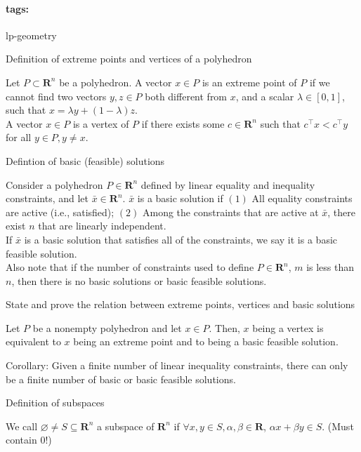 \documentclass[11pt]{article}
\newcommand{\reals}{\mathbf{R}}
\newcommand*{\tags}[1]{\paragraph{tags: }#1\bigskip}
\newcommand*{\xfield}[1]{\begin{mdframed}\centering #1\end{mdframed}\bigskip}
\newenvironment{field}{}{}
\newenvironment{note}{}{}
\begin{document}
\tags{lp-geometry}
\begin{note}
  \xfield{Definition of extreme points and vertices of a polyhedron}
  \begin{field}
    Let \(P \subset \reals^n\) be a polyhedron. A vector \(x \in P\)
    is an extreme point of \(P\) if we cannot find two vectors
    \(y,z \in P\) both different from \(x\), and a scalar
    \(\lambda \in [0,1]\), such that
    \(x = \lambda y + (1 - \lambda) z\).
    \\

    A vector \(x \in P\) is a vertex of \(P\) if there exists some
    \(c \in \reals^n\) such that \(c^\top x < c^\top y\) for all
    \(y \in P, y \not = x\).
  \end{field}
\end{note}
%
\begin{note}
  \xfield{Defintion of basic (feasible) solutions}
  \begin{field}
    Consider a polyhedron \(P \in \reals^n\) defined by linear
    equality and inequality constraints, and let
    \(\bar{x} \in \reals^n\). \(\bar{x}\) is a basic solution if
    \((1)\) All equality constraints are active (i.e., satisfied);
    \((2)\) Among the constraints that are active at \(\bar{x}\),
    there exist \(n\) that are linearly independent.
    \\

    If \(\bar{x}\) is a basic solution that satisfies all of the
    constraints, we say it is a basic feasible solution.
    \\

    Also note that if the number of constraints used to define \(P \in
    \reals^n\), \(m\) is less than \(n\), then there is no basic
    solutions or basic feasible solutions.
  \end{field}
\end{note}
%
\begin{note}
  \xfield{State and prove the relation between extreme points,
    vertices and basic solutions}
  \begin{field}
    Let \(P\) be a nonempty polyhedron and let \(x \in P\). Then,
    \(x\) being a vertex is equivalent to \(x\) being an extreme point
    and to being a basic feasible solution.

    Corollary: Given a finite number of linear inequality constraints,
    there can only be a finite number of basic or basic feasible
    solutions.
  \end{field}
\end{note}
%
\begin{note}
  \xfield{Definition of subspaces}
  \begin{field}
    We call \(\varnothing \not = S \subseteq \reals^n\) a subspace of
    \(\reals^n\) if \(\forall x, y \in S, \alpha, \beta \in \reals\),
    \(\alpha x + \beta y \in S\). (Must contain \(0\)!)
  \end{field}
\end{note}
\end{document}
